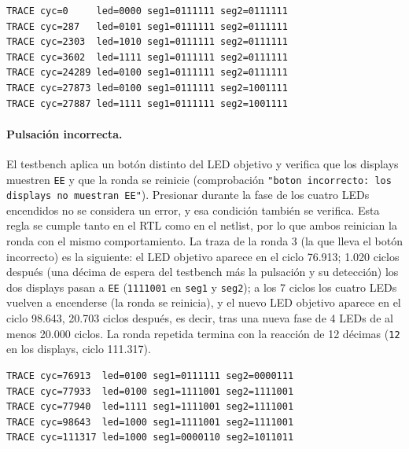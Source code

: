 \documentclass[11pt,letterpaper]{article}
\newcommand{\code}[1]{\texttt{#1}}
\begin{document}
\begin{samepage}
\begin{lstlisting}[caption={Inicio de la traza (RTL y netlist, idénticas).},label={lst:traza}]
TRACE cyc=0     led=0000 seg1=0111111 seg2=0111111
TRACE cyc=287   led=0101 seg1=0111111 seg2=0111111
TRACE cyc=2303  led=1010 seg1=0111111 seg2=0111111
TRACE cyc=3602  led=1111 seg1=0111111 seg2=0111111
TRACE cyc=24289 led=0100 seg1=0111111 seg2=0111111
TRACE cyc=27873 led=0100 seg1=0111111 seg2=1001111
TRACE cyc=27887 led=1111 seg1=0111111 seg2=1001111
\end{lstlisting}
\end{samepage}

\paragraph{Pulsación incorrecta.} El testbench aplica un botón distinto del LED objetivo y verifica que los displays muestren \code{EE} y que la ronda se reinicie (comprobación \code{"boton incorrecto: los displays no muestran EE"}). Presionar durante la fase de los cuatro LEDs encendidos no se considera un error, y esa condición también se verifica. Esta regla se cumple tanto en el RTL como en el netlist, por lo que ambos reinician la ronda con el mismo comportamiento. La traza de la ronda 3 (la que lleva el botón incorrecto) es la siguiente: el LED objetivo aparece en el ciclo 76.913; 1.020 ciclos después (una décima de espera del testbench más la pulsación y su detección) los dos displays pasan a \code{EE} (\code{1111001} en \code{seg1} y \code{seg2}); a los 7 ciclos los cuatro LEDs vuelven a encenderse (la ronda se reinicia), y el nuevo LED objetivo aparece en el ciclo 98.643, 20.703 ciclos después, es decir, tras una nueva fase de 4 LEDs de al menos 20.000 ciclos. La ronda repetida termina con la reacción de 12 décimas (\code{12} en los displays, ciclo 111.317).

\begin{samepage}
\begin{lstlisting}[caption={Traza de la ronda con botón incorrecto (RTL y netlist, idénticas).},label={lst:trazaerr}]
TRACE cyc=76913  led=0100 seg1=0111111 seg2=0000111
TRACE cyc=77933  led=0100 seg1=1111001 seg2=1111001
TRACE cyc=77940  led=1111 seg1=1111001 seg2=1111001
TRACE cyc=98643  led=1000 seg1=1111001 seg2=1111001
TRACE cyc=111317 led=1000 seg1=0000110 seg2=1011011
\end{lstlisting}
\end{samepage}
\end{document}
